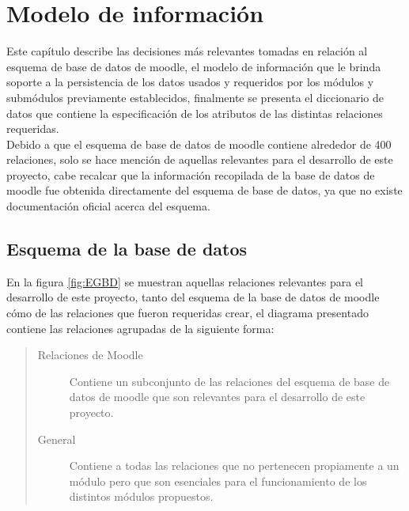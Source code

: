 \section{Modelo de información}
\label{ch:dominioDatos}

 Este capítulo describe las decisiones más relevantes tomadas en relación al esquema de
 base de datos de moodle, el modelo de información que le brinda soporte a la persistencia
 de los datos usados y requeridos por los módulos y submódulos previamente establecidos,
 finalmente se presenta el diccionario de datos que contiene la especificación de los
 atributos de las distintas relaciones requeridas.\\

 \noindent Debido a que el esquema de base de datos de moodle contiene alrededor de 400
 relaciones, solo se hace mención de aquellas relevantes para el desarrollo de este proyecto,
 cabe recalcar que la información recopilada de la base de datos de moodle fue obtenida
 directamente del esquema de base de datos, ya que no existe documentación oficial acerca
 del esquema.

\subsection{Esquema de la base de datos}


 En la figura \ref{fig:EGBD} se muestran aquellas relaciones relevantes para el desarrollo
 de este proyecto, tanto del esquema de la base de datos de moodle cómo de las relaciones
 que fueron requeridas crear, el diagrama presentado contiene las relaciones agrupadas
 de la siguiente forma:\\

    \begin{quote}
    \begin{description}
        \item[Relaciones de Moodle] Contiene un subconjunto de las relaciones del esquema de
            base de datos de moodle que son relevantes para el desarrollo de este proyecto.\\

        \item[General] Contiene a todas las relaciones que no pertenecen propiamente a un
            módulo pero que son esenciales para el funcionamiento de los distintos módulos
            propuestos.\\

    \end{description}
    \end{quote}

